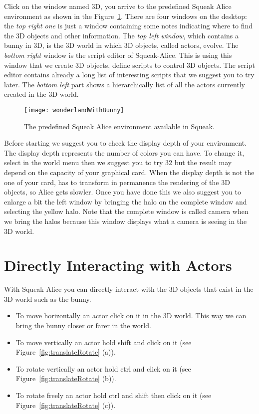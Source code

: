 Click on the window named 3D, you arrive to the predefined Squeak Alice environment as shown in the Figure~\ref{fig:wonderlandWithBunny}.  There are four windows on the desktop: the \textit{top right one} is just a window containing some notes indicating where to find the 3D objects and other information. The \textit{top left window}, which contains a bunny in 3D, is the 3D world in which 3D objects, called actors, evolve. The \textit{bottom right} window is the script editor of Squeak-Alice. This is using this window that we create 3D objects, define scripts to control 3D objects. The script editor contains already a long list of interesting scripts that we suggest you to try later. The \textit{bottom left} part
shows a hierarchically list of all the actors currently created in the 3D world.

\begin{figure}[h]
\begin{center}\texttt{[image: wonderlandWithBunny]}
\caption{The predefined Squeak Alice environment available in Squeak. \label{fig:wonderlandWithBunny}}\end{center}\end{figure}

Before starting we suggest you to check the display depth of your environment. The display depth represents the number of colors you can have. To change it, select  in the world menu then  we suggest you to try 32 but the result may depend on the capacity of your graphical card. When the display depth is not the one of your card, \sq has to transform in permanence the rendering of the 3D objects, so Alice gets slowler. Once you have done this we also suggest you to enlarge a bit the left window by bringing the halo on the complete window and selecting the yellow halo. Note that the complete window is called camera when we bring  the halos because this window displays what a camera is seeing in the 3D world. 


\section{Directly Interacting with Actors}
With Squeak Alice you can directly interact with the 3D objects that exist in the 3D world such as the bunny. 

\begin{itemize}
\item To move horizontally an actor click on it in the 3D world. This way we can bring the bunny closer or farer in the world. 
\item To move  vertically an actor hold shift and click on it (see Figure~\ref{fig:translateRotate} (a)).
\item To rotate vertically an actor hold ctrl and click on it (see Figure~\ref{fig:translateRotate} (b)).
\item To rotate freely  an actor hold ctrl and shift then click on it (see Figure~\ref{fig:translateRotate} (c)).
\end{itemize}

